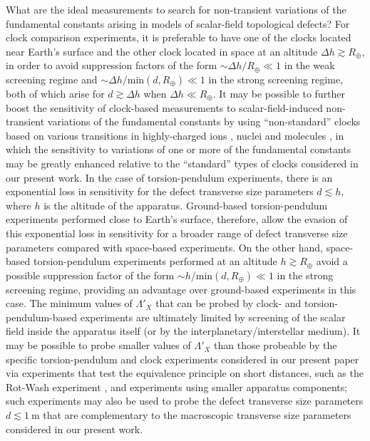 \documentclass[aps,prd,onecolumn,nofootinbib]{revtex4-2} %
\begin{document}
What are the ideal measurements to search for non-transient variations of the fundamental constants arising in models of scalar-field topological defects? 
For clock comparison experiments, it is preferable to have one of the clocks located near Earth's surface and the other clock located in space at an altitude $\Delta h \gtrsim R_\oplus$, in order to avoid suppression factors of the form $\sim \Delta h / R_\oplus \ll 1$ in the weak screening regime and $\sim \Delta h / \textrm{min} \left( d , R_\oplus \right) \ll 1$ in the strong screening regime, both of which arise for $d \gtrsim \Delta h$ when $\Delta h \ll R_\oplus$. 
It may be possible to further boost the sensitivity of clock-based measurements to scalar-field-induced non-transient variations of the fundamental constants by using ``non-standard'' clocks based on various transitions in highly-charged ions \cite{Berengut_2010_HCI-VFCs,Berengut_2011_HCI-VFCs}, nuclei \cite{Flambaum_2006_Th-VFCs} and molecules \cite{Flambaum_2007_mol-VFCs,Ye_2008_mol-VFCs,DeMille_2008_mol-VFCs}, in which the sensitivity to variations of one or more of the fundamental constants may be greatly enhanced relative to the ``standard'' types of clocks considered in our present work. 
In the case of torsion-pendulum experiments, there is an exponential loss in sensitivity for the defect transverse size parameters $d \lesssim h$, where $h$ is the altitude of the apparatus. 
Ground-based torsion-pendulum experiments performed close to Earth's surface, therefore, allow the evasion of this exponential loss in sensitivity for a broader range of defect transverse size parameters compared with space-based experiments. 
On the other hand, space-based torsion-pendulum experiments performed at an altitude $h \gtrsim R_\oplus$ avoid a possible suppression factor of the form $\sim h / \textrm{min} \left( d , R_\oplus \right) \ll 1$ in the strong screening regime, providing an advantage over ground-based experiments in this case. 
The minimum values of $\Lambda'_X$ that can be probed by clock- and torsion-pendulum-based experiments are ultimately limited by screening of the scalar field inside the apparatus itself (or by the interplanetary/interstellar medium). 
It may be possible to probe smaller values of $\Lambda'_X$ than those probeable by the specific torsion-pendulum and clock experiments considered in our present paper via experiments that test the equivalence principle on short distances, such as the Rot-Wash experiment \cite{Rot-Wash_exp_1999}, and experiments using smaller apparatus components; such experiments may also be used to probe the defect transverse size parameters $d \lesssim 1~\textrm{m}$ that are complementary to the macroscopic transverse size parameters considered in our present work. 
\end{document}
